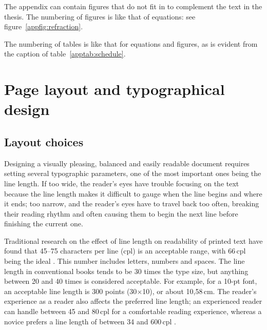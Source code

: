 \documentclass[english, 12pt, a4paper, sci, utf8, a-2b, online]{aaltothesis}
\begin{document}
The appendix can contain figures that do not fit in to complement the text in 
the thesis. The numbering of figures is like that of equations: see figure~\ref{appfig:refraction}.


The numbering of tables is like that for equations and figures, as is evident 
from the caption of table~\ref{apptab:schedule}.

\begin{table}[htb]
	\centering
	\caption{Caption for the table.}
	\label{apptab:schedule}
	\sffamily%
\end{table}


\clearpage
\section{Page layout and typographical design}
\label{app:layout}

\subsection*{Layout choices}

Designing a visually pleasing, balanced and easily readable document requires 
setting several typographic parameters, one of the most important ones being the
line length. If too wide, the reader’s eyes have trouble focusing on the text 
because the line length makes it difficult to gauge when the line begins and 
where it ends; too narrow, and the reader’s eyes have to travel back too often, 
breaking their reading rhythm and often causing them to begin the next line 
before finishing the current one.

Traditional research on the effect of line length on readability of printed text
have found that 45--75 characters per line (cpl) is an acceptable range, with 
66\,cpl being the ideal \cite{Bringhurst, Wikilinelength}. This number includes 
letters, numbers and spaces. The line length in conventional books tends to be 
30 times the type size, but anything between 20 and 40 times is considered 
acceptable. For example, for a 10-pt font, an acceptable line length is 300 
points (30$\times$10), or about 10,58\,cm. The reader’s experience as a reader 
also affects the preferred line length; an experienced reader can handle between
45 and 80\,cpl for a comfortable reading experience, whereas a novice prefers a 
line length of between 34 and 600\,cpl \cite{Unna}.
\end{document}
